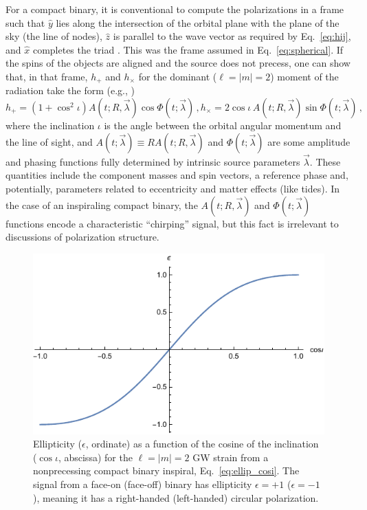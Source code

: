 \documentclass[aps,prd,twocolumn,superscriptaddress,preprintnumbers,floatfix,nofootinbib]{revtex4-2}
\newcommand{\beq}{\begin{equation}}
\newcommand{\eeq}{\end{equation}}
\newcommand*{\eq}[1]{Eq.~\eqref{eq:#1}}
\begin{document}
For a compact binary, it is conventional to compute the polarizations in a frame such that $\hat{y}$ lies along the intersection of the orbital plane with the plane of the sky (the line of nodes), $\hat{z}$ is parallel to the wave vector as required by \eq{hij}, and $\hat{x}$ completes the triad \cite{LALSuite:source}.
This was the frame assumed in \eq{spherical}.
If the spins of the objects are aligned and the source does not precess, one can show that, in that frame, $h_+$ and $h_\times$ for the dominant ($\ell=|m|=2$) moment of the radiation take the form (e.g., \cite{Poisson2014})
\begin{subequations} \label{eq:cbc}
\beq
h_+ = \left(1 + \cos^2 \iota\right) A(t; R, \vec{\lambda}) \cos \Phi(t; \vec{\lambda}) \, , 
\label{eq:cbc_p} 
\eeq
\beq
h_\times = 2 \cos \iota\, A(t; R, \vec{\lambda}) \sin \Phi(t; \vec{\lambda})\, ,
\label{eq:cbc_c}
\eeq
\end{subequations}
where the inclination $\iota$ is the angle between the orbital angular momentum and the line of sight, and $A(t; \vec{\lambda}) \equiv R  A(t; R, \vec{\lambda})$ and $\Phi(t; \vec{\lambda})$ are some amplitude and phasing functions fully determined by intrinsic source parameters $\vec{\lambda}$.
These quantities include the component masses and spin vectors, a reference phase and, potentially, parameters related to eccentricity and matter effects (like tides).
In the case of an inspiraling compact binary, the $A(t; R, \vec{\lambda})$ and $\Phi(t; \vec{\lambda})$ functions encode a characteristic ``chirping'' signal, but this fact is irrelevant to discussions of polarization structure.

\begin{figure}
\includegraphics[width=\columnwidth]{ellip_cosi}
\caption{Ellipticity ($\epsilon$, ordinate) as a function of the cosine of the inclination ($\cos\iota$, abscissa) for the $\ell = |m| = 2$ GW strain from a nonprecessing compact binary inspiral, Eq.~\eqref{eq:ellip_cosi}. The signal from a face-on (face-off) binary has ellipticity $\epsilon = +1$ ($\epsilon=-1$), meaning it has a right-handed (left-handed) circular polarization.}
\label{fig:ellip_cosi}
\end{figure}
\end{document}
